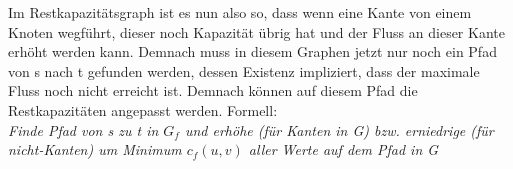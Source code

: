 \documentclass[
../../AuD-Zusammenfassung.tex,
]
{subfiles}
\begin{document}
Im Restkapazitätsgraph ist es nun also so, dass wenn eine Kante von einem Knoten wegführt, dieser noch Kapazität übrig hat und der Fluss an dieser Kante erhöht werden kann. Demnach muss in diesem Graphen jetzt nur noch ein Pfad von s nach t gefunden werden, dessen Existenz impliziert, dass der maximale Fluss noch nicht erreicht ist. Demnach können auf diesem Pfad die Restkapazitäten angepasst werden. Formell:\\
\textit{Finde Pfad von s zu t in $G_f$ und erhöhe (für Kanten in G) bzw. erniedrige (für nicht-Kanten) um Minimum $c_f(u,v)$ aller Werte auf dem Pfad in G}\\
\begin{algorithm}[H]
\end{algorithm}

\end{document}
